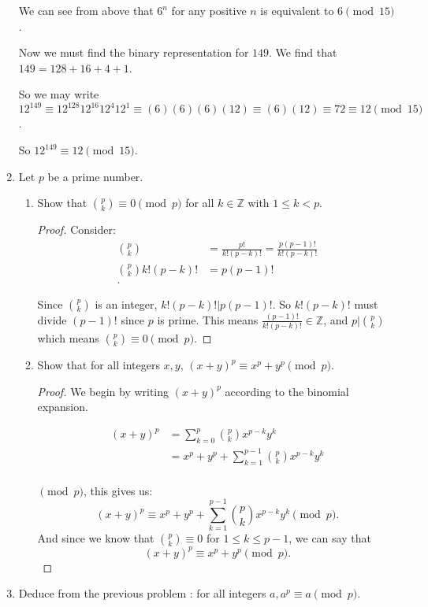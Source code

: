 \documentclass{article}
\begin{document}
\begin{enumerate}
We can see from above that $6^n$ for any positive $n$ is equivalent to $6\pmod{15}$.

Now we must find the binary representation for $149$. We find that $149=128+16+4+1$.

So we may write $12^{149}\equiv12^{128}12^{16}12^{4}12^{1}\equiv (6)(6)(6)(12)\equiv (6)(12)\equiv 72\equiv 12\pmod{15}$.

So $12^{149}\equiv 12\pmod{15}$.

\item Let $p$ be a prime number.
\begin{enumerate}[label= (\alph*)] 
    \item Show that $\binom{p}{k}\equiv 0\pmod{p}$ for all $k\in\mathbb{Z}$ with $1\leq k<p$.
    \begin{proof} 
        Consider:
        \begin{align*}
            \binom{p}{k}  &= \frac{p!}{ k! (p-k)!}=\frac{p(p-1)!}{k!(p-k)!} \\
            \binom{p}{k}k!(p-k)!&= p(p-1)! \\
        .\end{align*}
        
        Since $\binom{p}{k}$ is an integer, $k!(p-k)!|p(p-1)!$. So $k!(p-k)!$ must divide $(p-1)!$ since 
        $p$ is prime. This means $\frac{(p-1)!}{k!(p-k)!}\in\mathbb{Z}$, and $p|\binom{p}{k}$ which means 
        $\binom{p}{k}\equiv 0\pmod{p}$.
    \end{proof}
 
\item Show that for all integers $x,y$, $(x + y)^{p} \equiv  x^p + y^p \pmod{p}$.
    \begin{proof} 
        We begin by writing $(x+y)^{p}$ according to the binomial expansion. 
        
        \begin{align*}
            (x+y)^{p} &=\sum_{k=0}^{p} \binom{p}{k} x^{p-k}y^{k}\\
                     &= x^p+y^p+\sum_{k=1}^{p-1} \binom{p}{k}x^{p-k}y^{k} \\
        \end{align*}

        $\pmod{p}$, this gives us:
        \[
            (x+y)^{p} \equiv  x^p+y^p+\sum_{k=1}^{p-1} \binom{p}{k}x^{p-k}y^{k}\pmod{p}
        .\] 
        And since we know that $\binom{p}{k}\equiv 0$ for $1\leq k\leq p-1$, we can say that
        \[
            (x+y)^{p}\equiv x^{p}+y^{p}\pmod{p}
        .\] 
    \end{proof}
\end{enumerate}
\item Deduce from the previous problem : for all integers $a, a^p \equiv  a \pmod{p}$.


\end{enumerate}
\end{document}
